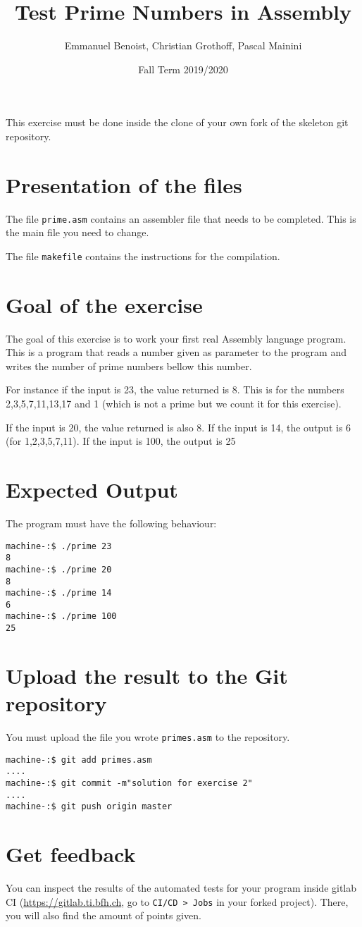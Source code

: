 \documentclass{scrartcl}
\title{Test Prime Numbers in Assembly}
\author{Emmanuel Benoist, Christian Grothoff, Pascal Mainini}
\date{Fall Term 2019/2020}
\begin{document}
\maketitle

This exercise must be done inside the clone of your own fork of the skeleton git repository.

\section{Presentation of the files}



The file \texttt{prime.asm} contains an assembler file that needs to be completed. This is the main file you need to change.

The file \texttt{makefile} contains the instructions for the compilation. 

\section{Goal of the exercise}

The goal of this exercise is to work your first real Assembly language program. This is a program that reads a number given as parameter to the program and writes the number of prime numbers bellow this number.

For instance if the input is 23, the value returned is 8. This is for the numbers 2,3,5,7,11,13,17 and 1 (which is not a prime but we count it for this exercise).

If the input is 20, the value returned is also 8. If the input is 14, the output is 6 (for 1,2,3,5,7,11). If the input is 100, the output is 25

\section{Expected Output}

The program must have the following behaviour:

\begin{lstlisting}
machine-:$ ./prime 23
8
machine-:$ ./prime 20 
8 
machine-:$ ./prime 14
6
machine-:$ ./prime 100
25
\end{lstlisting}

\section{Upload the result to the Git repository}
You must upload the file you wrote \texttt{primes.asm} to the repository.

\begin{lstlisting}
machine-:$ git add primes.asm
....
machine-:$ git commit -m"solution for exercise 2"
....
machine-:$ git push origin master
\end{lstlisting}%

\section{Get feedback}
You can inspect the results of the automated tests for your program inside gitlab CI (\url{https://gitlab.ti.bfh.ch}, go to \texttt{CI/CD > Jobs} in your forked project). There, you will also find the amount of points given.
\end{document}
